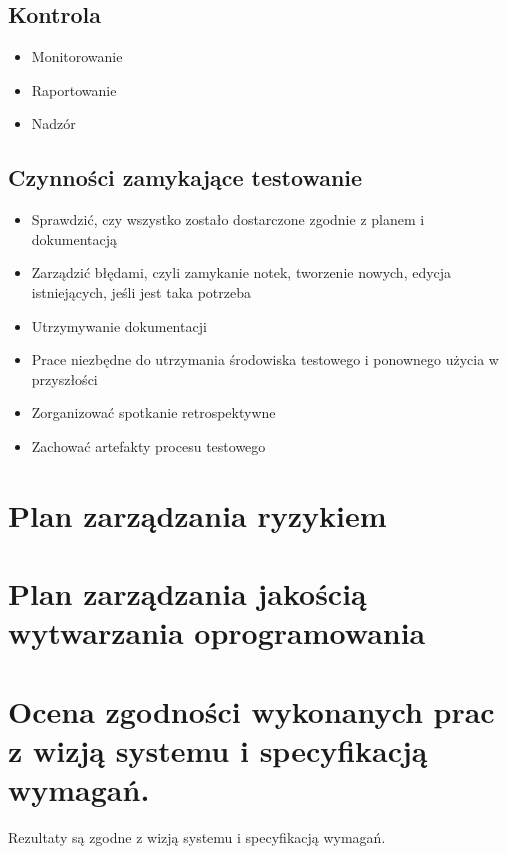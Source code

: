 \documentclass[12pt]{article}
\begin{document}
\subsection{Kontrola}
\begin{itemize}
\item Monitorowanie
\item Raportowanie
\item Nadzór
\end{itemize}

\subsection{Czynności zamykające testowanie}
\begin{itemize}
\item Sprawdzić, czy wszystko zostało dostarczone zgodnie z planem i dokumentacją
\item Zarządzić błędami, czyli zamykanie notek, tworzenie nowych, edycja istniejących, jeśli jest taka potrzeba
\item Utrzymywanie dokumentacji
\item Prace niezbędne do utrzymania środowiska testowego i ponownego użycia w przyszłości
\item Zorganizować spotkanie retrospektywne
\item Zachować artefakty procesu testowego
\end{itemize}

\section{Plan zarządzania ryzykiem}


\section{Plan zarządzania jakością wytwarzania oprogramowania}


\section{Ocena zgodności wykonanych prac z wizją systemu i specyfikacją wymagań.}

Rezultaty są zgodne z wizją systemu i specyfikacją wymagań.
\end{document}
